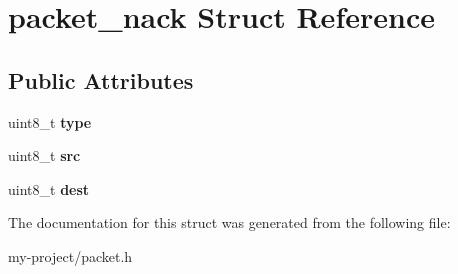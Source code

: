 \hypertarget{structpacket__nack}{}\section{packet\+\_\+nack Struct Reference}
\label{structpacket__nack}
\subsection*{Public Attributes}
\begin{DoxyCompactItemize}
\item 
\mbox{\label{structpacket__nack_ae95a3e809ee1533b00920aa490f0c96d}} 
uint8\+\_\+t {\bfseries type}
\item 
\mbox{\label{structpacket__nack_a9e3f67a3bdaf149dd5d2fdbb128d09f5}} 
uint8\+\_\+t {\bfseries src}
\item 
\mbox{\label{structpacket__nack_ac82c5fa1c0d3b2296b74ecb129dbea2a}} 
uint8\+\_\+t {\bfseries dest}
\end{DoxyCompactItemize}


The documentation for this struct was generated from the following file\+:\begin{DoxyCompactItemize}
\item 
my-\/project/packet.\+h\end{DoxyCompactItemize}
